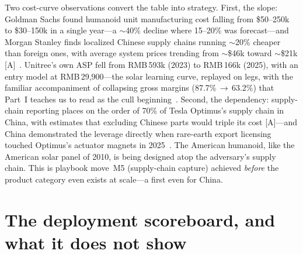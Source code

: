 Two cost-curve observations convert the table into strategy. First, the slope: Goldman Sachs found humanoid unit manufacturing cost falling from \$50--250k to \$30--150k in a single year---a $\sim$40\% decline where 15--20\% was forecast---and Morgan Stanley finds localized Chinese supply chains running $\sim$20\% cheaper than foreign ones, with average system prices trending from $\sim$\$46k toward $\sim$\$21k [A]~\cite{goldman-humanoid,ms-humanoid}. Unitree's own ASP fell from RMB\,593k (2023) to RMB\,166k (2025), with an entry model at RMB\,29{,}900---the solar learning curve, replayed on legs, with the familiar accompaniment of collapsing gross margins (87.7\%\,$\rightarrow$\,63.2\%) that Part~I teaches us to read as the cull beginning~\cite{unitree-ipo}. Second, the dependency: supply-chain reporting places on the order of 70\% of Tesla Optimus's supply chain in China, with estimates that excluding Chinese parts would triple its cost [A]---and China demonstrated the leverage directly when rare-earth export licensing touched Optimus's actuator magnets in 2025~\cite{optimus-china}. The American humanoid, like the American solar panel of 2010, is being designed atop the adversary's supply chain. This is playbook move~M5 (supply-chain capture) achieved \emph{before} the product category even exists at scale---a first even for China.

\section{The deployment scoreboard, and what it does not show}
\label{sec:embodied-scoreboard}

